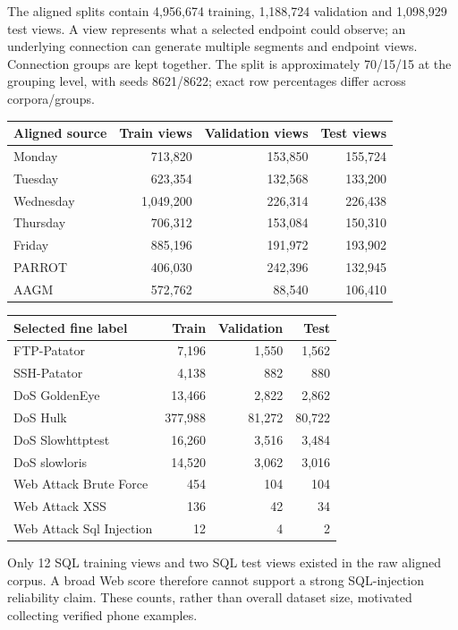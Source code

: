 \documentclass[11pt,a4paper,oneside]{report}
\begin{document}
The aligned splits contain 4,956,674 training, 1,188,724 validation and 1,098,929 test views. A view represents what a selected endpoint could observe; an underlying connection can generate multiple segments and endpoint views. Connection groups are kept together. The split is approximately 70/15/15 at the grouping level, with seeds 8621/8622; exact row percentages differ across corpora/groups.


{\small
\begin{longtable}{@{}lrrr@{}}
\toprule
Aligned source & Train views & Validation views & Test views\\\midrule\endhead
Monday & 713,820 & 153,850 & 155,724\\
Tuesday & 623,354 & 132,568 & 133,200\\
Wednesday & 1,049,200 & 226,314 & 226,438\\
Thursday & 706,312 & 153,084 & 150,310\\
Friday & 885,196 & 191,972 & 193,902\\
PARROT & 406,030 & 242,396 & 132,945\\
AAGM & 572,762 & 88,540 & 106,410\\
\bottomrule\end{longtable}
}



{\small
\begin{longtable}{@{}lrrr@{}}
\toprule
Selected fine label & Train & Validation & Test\\\midrule\endhead
FTP-Patator & 7,196 & 1,550 & 1,562\\
SSH-Patator & 4,138 & 882 & 880\\
DoS GoldenEye & 13,466 & 2,822 & 2,862\\
DoS Hulk & 377,988 & 81,272 & 80,722\\
DoS Slowhttptest & 16,260 & 3,516 & 3,484\\
DoS slowloris & 14,520 & 3,062 & 3,016\\
Web Attack Brute Force & 454 & 104 & 104\\
Web Attack XSS & 136 & 42 & 34\\
Web Attack Sql Injection & 12 & 4 & 2\\
\bottomrule\end{longtable}
}

Only 12 SQL training views and two SQL test views existed in the raw aligned corpus. A broad Web score therefore cannot support a strong SQL-injection reliability claim. These counts, rather than overall dataset size, motivated collecting verified phone examples.
\end{document}
